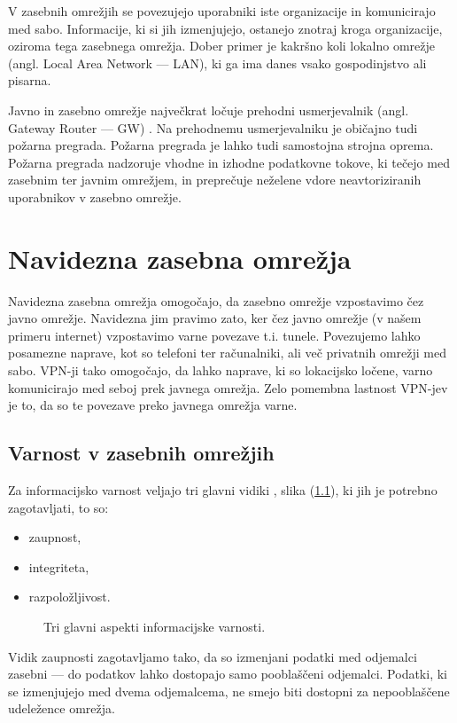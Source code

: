 \documentclass[a4paper, 12pt]{book}
\begin{document}
V zasebnih omrežjih se povezujejo uporabniki iste organizacije in komunicirajo med sabo. Informacije, ki si jih izmenjujejo, ostanejo znotraj kroga organizacije, oziroma tega zasebnega omrežja. Dober primer je kakršno koli lokalno omrežje (angl. Local Area Network --- LAN), ki ga ima danes vsako gospodinjstvo ali pisarna.

Javno in zasebno omrežje največkrat ločuje prehodni usmerjevalnik (angl. Gateway Router --- GW) \cite{scott_virtual_1999}. Na prehodnemu usmerjevalniku je običajno tudi požarna pregrada. Požarna pregrada je lahko tudi samostojna strojna oprema. Požarna pregrada nadzoruje vhodne in izhodne podatkovne tokove, ki tečejo med zasebnim ter javnim omrežjem, in preprečuje neželene vdore neavtoriziranih uporabnikov v zasebno omrežje.

\chapter{Navidezna zasebna omrežja}
\label{ch0}

Navidezna zasebna omrežja omogočajo, da zasebno omrežje vzpostavimo čez javno omrežje. Navidezna jim pravimo zato, ker čez javno omrežje (v našem primeru internet) vzpostavimo varne povezave t.i. tunele. Povezujemo lahko posamezne naprave, kot so telefoni ter računalniki, ali več privatnih omrežji med sabo. VPN-ji tako omogočajo, da lahko naprave, ki so lokacijsko ločene, varno komunicirajo med seboj prek javnega omrežja. Zelo pomembna lastnost VPN-jev je to, da so te povezave preko javnega omrežja varne.


\section{Varnost v zasebnih omrežjih}

Za informacijsko varnost veljajo tri glavni vidiki \cite{muniz_ccnp_2021}, slika (\ref{varnost}), ki jih je potrebno zagotavljati, to so:
\begin{itemize}
    \setlength\itemsep{0em}
    \item zaupnost,
    \item integriteta,
    \item razpoložljivost.

\end{itemize}

\begin{figure}[h]
\begin{center}

\end{center}
\caption{Tri glavni aspekti informacijske varnosti. \cite{laybats_information_2016}}
\label{varnost}
\end{figure}
Vidik zaupnosti zagotavljamo tako, da so izmenjani podatki med odjemalci zasebni --- do podatkov lahko dostopajo samo pooblaščeni odjemalci. Podatki, ki se izmenjujejo med dvema odjemalcema, ne smejo biti dostopni za nepooblaščene udeležence omrežja.
\end{document}
